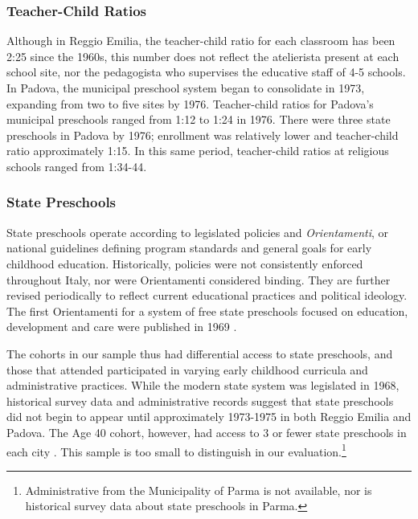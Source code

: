 \subsubsection{Teacher-Child Ratios}

Although in Reggio Emilia, the teacher-child ratio for each classroom has been 2:25 since the 1960s, this number does not reflect the atelierista present at each school site, nor the pedagogista who supervises the educative staff of 4-5 schools. In Padova, the municipal preschool system began to consolidate in 1973, expanding from two to five sites by 1976. Teacher-child ratios for Padova's municipal preschools ranged from 1:12 to 1:24 in 1976. There were three state preschools in Padova by 1976; enrollment was relatively lower and teacher-child ratio approximately 1:15. In this same period, teacher-child ratios at religious schools ranged from 1:34-44.

\subsubsection{State Preschools}

State preschools operate according to legislated policies and \textit{Orientamenti}, or national guidelines defining program standards and general goals for early childhood education. Historically, policies were not consistently enforced throughout Italy, nor were Orientamenti considered binding. They are further revised periodically to reflect current educational practices and political ideology. The first Orientamenti for a system of free state preschools focused on education, development and care were published in 1969 \citep{Corsaro_1996_Early-Edu,Hohnerlein_2015_Development-and-DiffusionEnrollment}.

The cohorts in our sample thus had differential access to state preschools, and those that attended participated in varying early childhood curricula and administrative practices. While the modern state system was legislated in 1968, historical survey data and administrative records suggest that state preschools did not begin to appear until approximately 1973-1975 in both Reggio Emilia and Padova. The Age 40 cohort, however, had access to 3 or fewer state preschools in each city \citep{Reggio-Admin-data_1966-2006, Reggio-Annual-Journals_1994-2011, Padova-Admin-Data_1964-2011}. This sample is too small to distinguish in our evaluation.\footnote{Administrative from the Municipality of Parma is not available, nor is historical survey data about state preschools in Parma.} 

